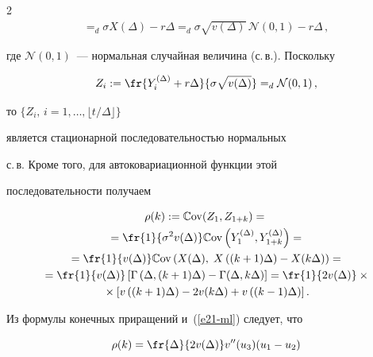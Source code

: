 \begin{multicols}{2}
\begin{multline*}
{}=_d \sigma X(\Delta)-r\Delta =_d \sigma \sqrt{v(\Delta)}\,\mathcal{N} (0,1)-r\Delta\,,


\end{multline*}


где $\mathcal{N} (0,1)$~--- нормальная случайная величина (с.\,в.). Поскольку


\begin{equation}


Z_i :=\fr{Y_i^{(\Delta)}+r\Delta }{\sigma \sqrt{v(\Delta)}}=_d


\mathcal{N}(0,1)\,,\label{e19-ml}


\end{equation} 


то $\{Z_i,\,i=1,\ldots,\lfloor t/\Delta \rfloor\}$  


является  стационарной последовательностью нормальных


с.\,в. Кроме того, для автоковариационной функции этой


последовательности получаем


\begin{multline}


\rho(k):=\mathbb{C}\mathrm{ov}(Z_1,Z_{1+k})


={}\\


{}=\fr{1}{\sigma^2 v(\Delta)}\mathbb{C}\mathrm{ov} \left( Y_1^{(\Delta)},Y_{1+k}^{(\Delta)} \right)={}\\


{}=\fr{1}{v(\Delta)}\mathbb{C}\mathrm{ov} \left(X(\Delta),\;X\left((k+1)\Delta\right)-X(k\Delta) \right)={}\\


{}=\fr{1}{v(\Delta)}\left[


\Gamma\left(\Delta,(k+1)\Delta\right)-\Gamma(\Delta,k\Delta) \right]=


\fr{1}{2v(\Delta)}\times{}\\


{}\times\left[ v\left( (k+1)\Delta


\right)-2v(k\Delta)+v\left( (k-1)\Delta\right) \right].\label{e21-ml}


\end{multline}


Из  формулы конечных приращений и~(\ref{e21-ml}) следует, что


$$


\rho(k)=\fr{\Delta}{2v(\Delta)}v''(u_3)(u_1-u_2)


$$



\end{multicols}
